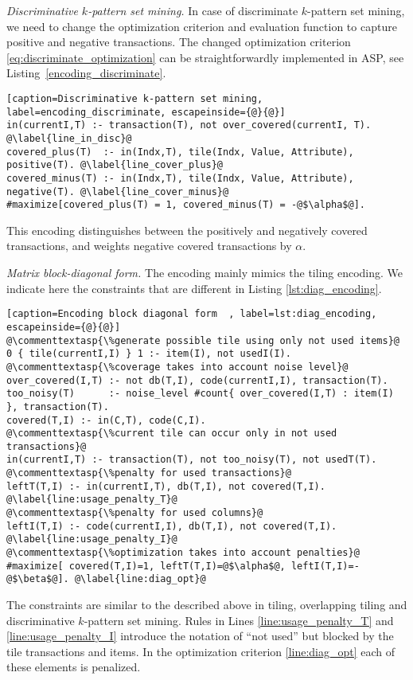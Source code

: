 \textit{Discriminative $k$-pattern set mining.} In case of discriminate $k$-pattern set mining, we need to change the optimization criterion and evaluation function to capture positive and negative transactions. The changed optimization criterion \ref{eq:discriminate_optimization} can be straightforwardly implemented in ASP, see Listing~\ref{encoding_discriminate}.

\begin{lstlisting}[caption=Discriminative k-pattern set mining, label=encoding_discriminate, escapeinside={@}{@}] 
in(currentI,T) :- transaction(T), not over_covered(currentI, T). @\label{line_in_disc}@
covered_plus(T)  :- in(Indx,T), tile(Indx, Value, Attribute), positive(T). @\label{line_cover_plus}@
covered_minus(T) :- in(Indx,T), tile(Indx, Value, Attribute), negative(T). @\label{line_cover_minus}@
#maximize[covered_plus(T) = 1, covered_minus(T) = -@$\alpha$@].
\end{lstlisting}

This encoding distinguishes between the positively and negatively covered transactions, and weights negative covered transactions by $\alpha$.

\textit{Matrix block-diagonal form.} The encoding mainly mimics the tiling encoding. We indicate here the constraints that are different in Listing \ref{lst:diag_encoding}.
\begin{lstlisting}[caption=Encoding block diagonal form  , label=lst:diag_encoding, escapeinside={@}{@}] 
@\commenttextasp{\%generate possible tile using only not used items}@
0 { tile(currentI,I) } 1 :- item(I), not usedI(I).
@\commenttextasp{\%coverage takes into account noise level}@
over_covered(I,T) :- not db(T,I), code(currentI,I), transaction(T).
too_noisy(T)      :- noise_level #count{ over_covered(I,T) : item(I) }, transaction(T).
covered(T,I) :- in(C,T), code(C,I).
@\commenttextasp{\%current tile can occur only in not used transactions}@
in(currentI,T) :- transaction(T), not too_noisy(T), not usedT(T).
@\commenttextasp{\%penalty for used transactions}@
leftT(T,I) :- in(currentI,T), db(T,I), not covered(T,I). @\label{line:usage_penalty_T}@
@\commenttextasp{\%penalty for used columns}@
leftI(T,I) :- code(currentI,I), db(T,I), not covered(T,I). @\label{line:usage_penalty_I}@
@\commenttextasp{\%optimization takes into account penalties}@
#maximize[ covered(T,I)=1, leftT(T,I)=@$\alpha$@, leftI(T,I)=-@$\beta$@]. @\label{line:diag_opt}@
\end{lstlisting}

The constraints are similar to the described above in tiling, overlapping tiling and discriminative $k$-pattern set mining. Rules in Lines \ref{line:usage_penalty_T} and \ref{line:usage_penalty_I} introduce the notation of ``not used'' but blocked by the tile transactions and items. In the optimization criterion \ref{line:diag_opt} each of these elements is penalized.



